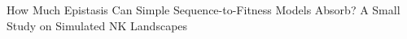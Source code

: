 How Much Epistasis Can Simple Sequence-to-Fitness Models Absorb? A Small Study on Simulated NK Landscapes
